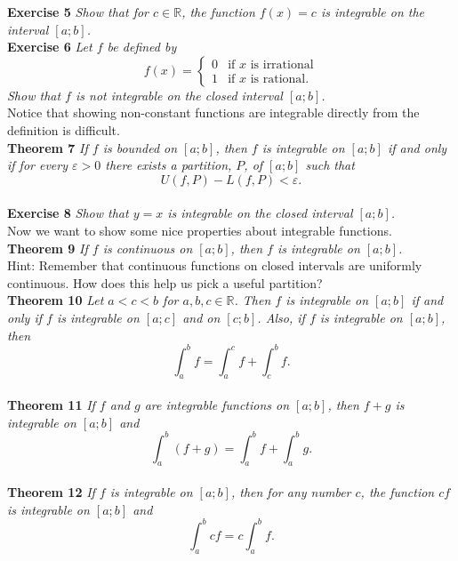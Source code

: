 \documentclass{article}
\begin{document}
\noindent \textbf{Exercise 5}
\textit{Show that for $c \in \mathbb{R}$, the function $f(x) = c$ is integrable on the interval $[a;b]$.}\\

\noindent \textbf{Exercise 6}
\textit{Let $f$ be defined by
\[
f(x) =
\begin{cases}
0 & \text{if $x$ is irrational}\\
1 & \text{if $x$ is rational}.
\end{cases}
\]
Show that $f$ is not integrable on the closed interval $[a;b]$.}\\

Notice that showing non-constant functions are integrable directly from the definition is difficult.\\

\noindent \textbf{Theorem 7}
\textit{If $f$ is bounded on $[a;b]$, then $f$ is integrable on $[a;b]$ if and only if for every $\varepsilon > 0$ there exists a partition, $P$, of $[a;b]$ such that
\[
U(f,P) - L(f,P) < \varepsilon.
\]}\\

\noindent \textbf{Exercise 8}
\textit{Show that $y=x$ is integrable on the closed interval $[a;b]$.}\\

Now we want to show some nice properties about integrable functions.\\

\noindent \textbf{Theorem 9}
\textit{If $f$ is continuous on $[a;b]$, then $f$ is integrable on $[a;b]$.}\\

Hint: Remember that continuous functions on closed intervals are uniformly continuous. How does this help us pick a useful partition?\\

\noindent \textbf{Theorem 10}
\textit{Let $a<c<b$ for $a,b,c \in \mathbb{R}$. Then $f$ is integrable on $[a;b]$ if and only if $f$ is integrable on $[a;c]$ and on $[c;b]$. Also, if $f$ is integrable on $[a;b]$, then
\[
\int_a^b f = \int_a^c f + \int_c^b f.
\]}\\

\noindent \textbf{Theorem 11}
\textit{If $f$ and $g$ are integrable functions on $[a;b]$, then $f+g$ is integrable on $[a;b]$ and
\[
\int_a^b (f+g) = \int_a^b f + \int_a^b g.
\]}\\

\noindent \textbf{Theorem 12}
\textit{If $f$ is integrable on $[a;b]$, then for any number $c$, the function $cf$ is integrable on $[a;b]$ and
\[
\int_a^b cf = c \int_a^b f.
\]}\\
\end{document}
